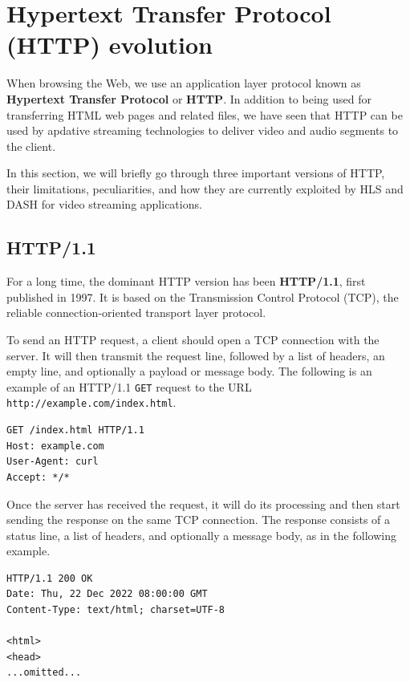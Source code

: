 \section{Hypertext Transfer Protocol (HTTP) evolution}
\label{sec:bg/http}

When browsing the Web, we use an application layer protocol known as \textbf{Hypertext Transfer Protocol} or \textbf{HTTP}. In addition to being used for transferring HTML web pages and related files, we have seen that HTTP can be used by apdative streaming technologies to deliver video and audio segments to the client.

In this section, we will briefly go through three important versions of HTTP, their limitations, peculiarities, and how they are currently exploited by HLS and DASH for video streaming applications.

\subsection{HTTP/1.1}
\label{sec:bg/http1}

For a long time, the dominant HTTP version has been \textbf{HTTP/1.1}, first published in 1997.\cite{http1.1} It is based on the Transmission Control Protocol (TCP), the reliable connection-oriented transport layer protocol.

To send an HTTP request, a client should open a TCP connection with the server. It will then transmit the request line, followed by a list of headers, an empty line, and optionally a payload or message body. The following is an example of an HTTP/1.1 \texttt{GET} request to the URL \texttt{http://example.com/index.html}.

\begin{verbatim}
GET /index.html HTTP/1.1
Host: example.com
User-Agent: curl
Accept: */*
\end{verbatim}

Once the server has received the request, it will do its processing and then start sending the response on the same TCP connection. The response consists of a status line, a list of headers, and optionally a message body, as in the following example.

\begin{verbatim}
HTTP/1.1 200 OK
Date: Thu, 22 Dec 2022 08:00:00 GMT
Content-Type: text/html; charset=UTF-8

<html>
<head>
...omitted...
\end{verbatim}

